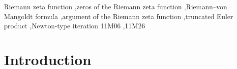 \documentclass[preprint,12pt]{elsarticle}
\numberwithin{equation}{section}
\theoremstyle{plain}
\theoremstyle{definition}
\theoremstyle{remark}
\begin{document}
\begin{frontmatter}
\begin{abstract}
constant of (E) is obtained without evaluating the zeta function. The clock equation corrected by the primes $p\le X$ is, up to the term $1/(48t)$ of Stirling's series, the prime equation proposed by LeClair for the $n$-th zero, whose accuracy was estimated there numerically; (B) and (D) are proved statements about that equation at the true ordinates and about explicit corrected points.
\end{abstract}

\begin{keyword}
Riemann zeta function \sep zeros of the Riemann zeta function \sep Riemann--von Mangoldt formula \sep argument of the Riemann zeta function \sep truncated Euler product \sep Newton-type iteration
\MSC[2020] 11M06 \sep 11M26
\end{keyword}
\end{frontmatter}

\tableofcontents

\section{Introduction}
\label{sec:introduction}
\end{document}
